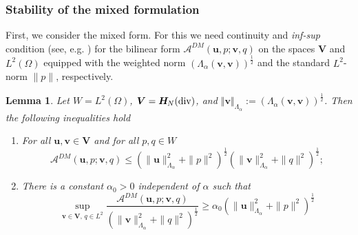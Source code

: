 \documentclass[11pt]{amsart}
\numberwithin{equation}{section}
\newtheorem{lemma}{Lemma}[section]
\theoremstyle{definition}\newtheorem{example}{Example}[section]
\begin{document}
\subsubsection{Stability of the mixed formulation}
First, we consider the mixed form. For this we need continuity  and 
 {\it inf-sup} condition (see, e.g. \cite{1991BrezziF_FortinM-aa})
for the bilinear form  ${{\mathcal A}}^{DM}({{\mathbf u}},p; {{\mathbf v}},q)$
on the spaces $ {{\boldsymbol V}} $ and $L^2(\Omega)$  equipped with  the weighted norm 
$ (\Lambda_{{\alpha}}({{\mathbf v}},{{\mathbf v}}))^{\frac{1}{2}}$ and the standard $L^2$-norm $\|p\|$,
respectively.

\begin{lemma} \label{lem:stab_var}
Let $W=L^2(\Omega)$, ${{\boldsymbol V}}={{\boldsymbol H}_{\hspace{-0.2mm}N}}({\operatorname{div}})$, and $\Vert {{\mathbf v}} \Vert_{\Lambda_{{\alpha}}}:=
(\Lambda_{{\alpha}}({{\mathbf v}},{{\mathbf v}}))^{\frac{1}{2}}$. Then the following inequalities hold 
\begin{enumerate}
\item 
For all ${{\mathbf u}}, {{\mathbf v}}\in{{\boldsymbol V}}$ and  for all  $p, q\in W$
\begin{equation}\label{continuity}
{{\mathcal A}}^{DM}({{\mathbf u}},p; {{\mathbf v}},q) 
\le ( \|{{\mathbf u}}\|^2_{\Lambda_{{\alpha}}} +\|p\|^2)^\frac12( \|{{\mathbf v}}\|^2_{\Lambda_{{\alpha}}} +\|q\|^2)^\frac12;
\end{equation}  
\item There is a constant ${{\alpha}}_0>0$ independent of $\alpha$ such that
\begin{equation}\label{A-infsup}
\sup_{{{\mathbf v}} \in {{\boldsymbol V}}, \, q \in L^2} 
\frac{{{\mathcal A}}^{DM}({{\mathbf u}},p; {{\mathbf v}},q) }{(\|{{\mathbf v}}\|^2_{\Lambda_{{\alpha}}} +\|q\|^2)^\frac12} 
\ge \alpha_0 ( \|{{\mathbf u}}\|^2_{\Lambda_{{\alpha}}} +\|p\|^2 )^\frac12
\end{equation}

\end{enumerate}

\end{lemma}
\end{document}
